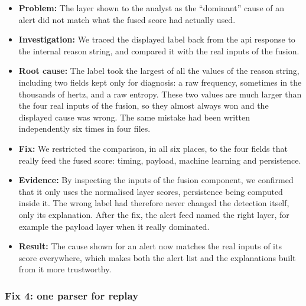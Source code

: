 \begin{itemize}
    \item \textbf{Problem:} The layer shown to the analyst as the ``dominant'' cause of an alert did not match what the fused score had actually used.
    \item \textbf{Investigation:} We traced the displayed label back from the \gls{api} response to the internal reason string, and compared it with the real inputs of the fusion.
    \item \textbf{Root cause:} The label took the largest of all the values of the reason string, including two fields kept only for diagnosis: a raw frequency, sometimes in the thousands of hertz, and a raw entropy. These two values are much larger than the four real inputs of the fusion, so they almost always won and the displayed cause was wrong. The same mistake had been written independently six times in four files.
    \item \textbf{Fix:} We restricted the comparison, in all six places, to the four fields that really feed the fused score: timing, payload, machine learning and persistence.
    \item \textbf{Evidence:} By inspecting the inputs of the fusion component, we confirmed that it only uses the normalised layer scores, persistence being computed inside it. The wrong label had therefore never changed the detection itself, only its explanation. After the fix, the alert feed named the right layer, for example the payload layer when it really dominated.
    \item \textbf{Result:} The cause shown for an alert now matches the real inputs of its score everywhere, which makes both the alert list and the explanations built from it more trustworthy.
\end{itemize}

\subsubsection{Fix 4: one parser for replay}

